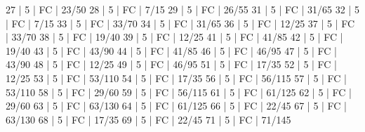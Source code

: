 27    |  5     |    FC                                        | 23/50   
28    |  5     |    FC                                        | 7/15   
29    |  5     |    FC                                        | 26/55   
31    |  5     |    FC                                        | 31/65   
32    |  5     |    FC                                        | 7/15   
33    |  5     |    FC                                        | 33/70   
34    |  5     |    FC                                        | 31/65   
36    |  5     |    FC                                        | 12/25   
37    |  5     |    FC                                        | 33/70   
38    |  5     |    FC                                        | 19/40   
39    |  5     |    FC                                        | 12/25   
41    |  5     |    FC                                        | 41/85   
42    |  5     |    FC                                        | 19/40   
43    |  5     |    FC                                        | 43/90   
44    |  5     |    FC                                        | 41/85   
46    |  5     |    FC                                        | 46/95   
47    |  5     |    FC                                        | 43/90   
48    |  5     |    FC                                        | 12/25   
49    |  5     |    FC                                        | 46/95   
51    |  5     |    FC                                        | 17/35   
52    |  5     |    FC                                        | 12/25   
53    |  5     |    FC                                        | 53/110   
54    |  5     |    FC                                        | 17/35   
56    |  5     |    FC                                        | 56/115   
57    |  5     |    FC                                        | 53/110   
58    |  5     |    FC                                        | 29/60   
59    |  5     |    FC                                        | 56/115   
61    |  5     |    FC                                        | 61/125   
62    |  5     |    FC                                        | 29/60   
63    |  5     |    FC                                        | 63/130   
64    |  5     |    FC                                        | 61/125   
66    |  5     |    FC                                        | 22/45   
67    |  5     |    FC                                        | 63/130   
68    |  5     |    FC                                        | 17/35   
69    |  5     |    FC                                        | 22/45   
71    |  5     |    FC                                        | 71/145   

